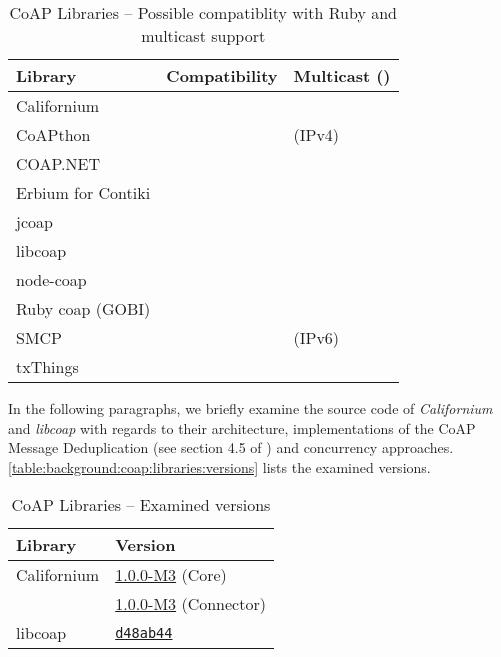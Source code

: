 		\begin{table}[H]
			\begin{center}
				\begin{tabular}{l|l|l}
					Library				& Compatibility	& Multicast (\cite{coap-group}) \\
					\hline
					Californium			& \y			& \n \\
					CoAPthon			& \n			& \y (\acs{IPv4}) \\
					COAP.NET			& \n			& \n \\
					Erbium for Contiki	& \n			& \n \\
					jcoap				& \y			& \n \\
					libcoap				& \y			& \n \ode-coap			& \n			& \n \\
					Ruby coap (GOBI)	& \y			& \n \\
					SMCP				& \y			& \y (\acs{IPv6}) \\
					txThings			& \n			& \n \\
				\end{tabular}
			\end{center}
			\caption{CoAP Libraries -- Possible compatiblity with Ruby and
				multicast support}
			\label{table:background:coap:libraries}
		\end{table}


		In the following paragraphs, we briefly examine the source code of
		\emph{Californium} and \emph{libcoap} with regards to their
		architecture, implementations of the \ac{CoAP} Message Deduplication
		(see section 4.5 of \cite{coap}) and concurrency approaches.
		\autoref{table:background:coap:libraries:versions} lists the examined
		versions.

		\begin{table}[H]
			\begin{center}
				\begin{tabular}{l|l}
					Library				& Version \\
					\hline
					Californium			& \href{https://github.com/eclipse/californium/tree/1.0.0-M3}{1.0.0-M3} (Core) \\
					& \href{https://github.com/eclipse/californium.element-connector/tree/1.0.0-M3}{1.0.0-M3} (Connector) \\
					libcoap				& \href{http://sourceforge.net/p/libcoap/code/ci/d48ab449fd05801e574e4966023589ed7dac500b/tree}{\texttt{d48ab44}} \\
				\end{tabular}
			\end{center}
			\caption{CoAP Libraries -- Examined versions}
			\label{table:background:coap:libraries:versions}
		\end{table}

